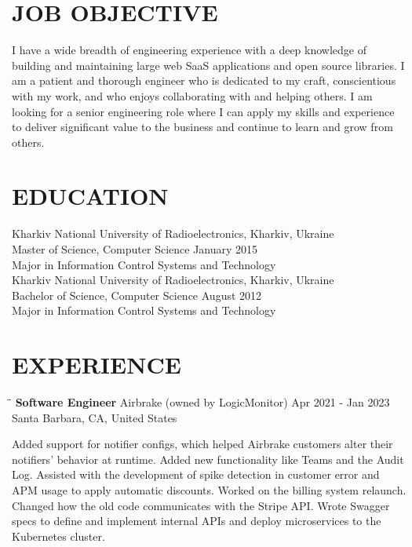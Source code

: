 \documentclass{res}
\begin{document}
\address{Kharkiv, Ukraine\\silin@kyrylo.org\\+380 98 909-30-34}

\begin{resume}

  \section{JOB OBJECTIVE}
  I have a wide breadth of engineering experience with a deep knowledge of
  building and maintaining large web SaaS applications and open source
  libraries. I am a patient and thorough engineer who is dedicated to my craft,
  conscientious with my work, and who enjoys collaborating with and helping
  others. I am looking for a senior engineering role where I can apply my skills
  and experience to deliver significant value to the business and continue to
  learn and grow from others.

  \section{EDUCATION}
  Kharkiv National University of Radioelectronics, Kharkiv, Ukraine \\
  Master of Science, Computer Science \hfill January 2015 \\
  Major in Information Control Systems and Technology \\

  Kharkiv National University of Radioelectronics, Kharkiv, Ukraine \\
  Bachelor of Science, Computer Science \hfill August 2012 \\
  Major in Information Control Systems and Technology \\

  \section{EXPERIENCE}
  \vspace{-0.1in}

  \begin{tabbing}
    \hspace{2.3in}\= \hspace{2.6in}\= \kill
    {\bf Software Engineer}  \>Airbrake (owned by LogicMonitor) \>
    \hspace{-0.2in} Apr 2021 - Jan 2023\\
    \>Santa Barbara, CA, United States
  \end{tabbing}\vspace{-20pt}
  Added support for notifier configs, which helped Airbrake customers alter
  their notifiers' behavior at runtime. Added new functionality like Teams and
  the Audit Log. Assisted with the development of spike detection in customer
  error and APM usage to apply automatic discounts. Worked on the billing system
  relaunch. Changed how the old code communicates with the Stripe API. Wrote
  Swagger specs to define and implement internal APIs and deploy microservices
  to the Kubernetes cluster.


\end{resume}
\end{document}
